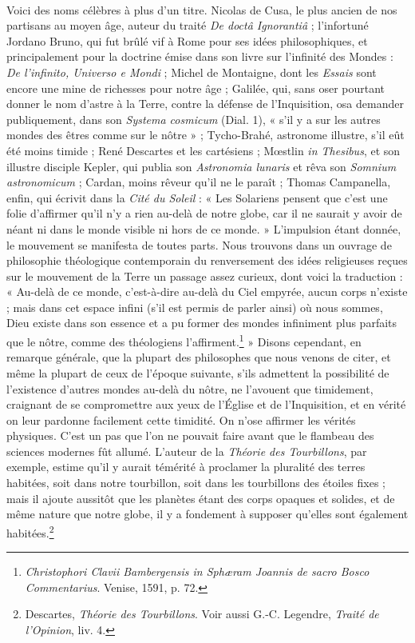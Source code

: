 \documentclass[a4paper, 11pt, oneside]{article}
\begin{document}
\paragraph{}
Voici des noms célèbres à plus d'un titre. Nicolas de Cusa, le plus ancien de nos partisans au moyen âge, auteur du traité \emph{De doctâ Ignorantiâ} ; l'infortuné Jordano Bruno, qui fut brûlé vif à Rome pour ses idées philosophiques, et principalement pour la doctrine émise dans son livre sur l'infinité des Mondes : \emph{De l'infinito, Universo e Mondi} ; Michel de Montaigne, dont les \emph{Essais} sont encore une mine de richesses pour notre âge ; Galilée, qui, sans oser pourtant donner le nom d'astre à la Terre, contre la défense de l'Inquisition, osa demander publiquement, dans son \emph{Systema cosmicum} (Dial. 1), « s'il y a sur les autres mondes des êtres comme sur le nôtre » ; Tycho-Brahé, astronome illustre, s'il eût été moins timide ; René Descartes et les cartésiens ; Mœstlin \emph{in Thesibus}, et son illustre disciple Kepler, qui publia son \emph{Astronomia lunaris} et rêva son \emph{Somnium astronomicum} ; Cardan, moins rêveur qu'il ne le paraît ; Thomas Campanella, enfin, qui écrivit dans la \emph{Cité du Soleil} : « Les Solariens pensent que c'est une folie d'affirmer qu'il n'y a rien au-delà de notre globe, car il ne saurait y avoir de néant ni dans le monde visible ni hors de ce monde. » L'impulsion étant donnée, le mouvement se manifesta de toutes parts. Nous trouvons dans un ouvrage de philosophie théologique contemporain du renversement des idées religieuses reçues sur le mouvement de la Terre un passage assez curieux, dont voici la traduction : « Au-delà de ce monde, c'est-à-dire au-delà du Ciel empyrée, aucun corps n'existe ; mais dans cet espace infini (s'il est permis de parler ainsi) où nous sommes, Dieu existe dans son essence et a pu former des mondes infiniment plus parfaits que le nôtre, comme des théologiens l'affirment.\footnote{\emph{Christophori Clavii Bambergensis in Sphæram Joannis de sacro Bosco Commentarius}. Venise, 1591, p. 72.} » Disons cependant, en remarque générale, que la plupart des philosophes que nous venons de citer, et même la plupart de ceux de l'époque suivante, s'ils admettent la possibilité de l'existence d'autres mondes au-delà du nôtre, ne l'avouent que timidement, craignant de se compromettre aux yeux de l'Église et de l'Inquisition, et en vérité on leur pardonne facilement cette timidité. On n'ose affirmer les vérités physiques. C'est un pas que l'on ne pouvait faire avant que le flambeau des sciences modernes fût allumé. L'auteur de la \emph{Théorie des Tourbillons}, par exemple, estime qu'il y aurait témérité à proclamer la pluralité des terres habitées, soit dans notre tourbillon, soit dans les tourbillons des étoiles fixes ; mais il ajoute aussitôt que les planètes étant des corps opaques et solides, et de même nature que notre globe, il y a fondement à supposer qu'elles sont également habitées.\footnote{Descartes, \emph{Théorie des Tourbillons}. Voir aussi G.-C. Legendre, \emph{Traité de l'Opinion}, liv. 4.}
\end{document}
